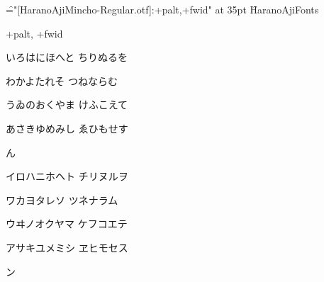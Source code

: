 
\nopagenumbers

\font\f="[HaranoAjiMincho-Regular.otf]:+palt,+fwid" at 35pt \f

HaranoAjiFonts

+palt, +fwid

いろはにほへと
ちりぬるを

わかよたれそ
つねならむ

うゐのおくやま
けふこえて

あさきゆめみし
ゑひもせす

ん

イロハニホヘト
チリヌルヲ

ワカヨタレソ
ツネナラム

ウヰノオクヤマ
ケフコエテ

アサキユメミシ
ヱヒモセス

ン

\bye
